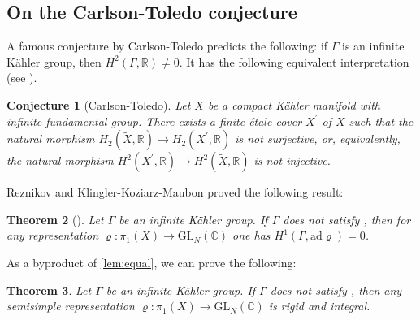 \documentclass[11pt,a4paper,english]{smfart}
\theoremstyle{plain}
\newtheorem{theorem}{Theorem}[section]
\newtheorem{conj}[theorem]{Conjecture}
\theoremstyle{definition}
\theoremstyle{plain}
\newcommand\GL{\mathrm{GL}}
\def\bR{\mathbb{R}}
\def\bC{\mathbb{C}}
\begin{document}
	\iffalse
	\subsection{On the Carlson-Toledo conjecture}
	A famous conjecture by Carlson-Toledo predicts the following: if $\Gamma$ is an infinite Kähler group, then 
	$H^2(\Gamma,\bR)\neq 0$. It has the following equivalent interpretation (see \cite{KKM11}). 
	\begin{conj}[Carlson-Toledo]\label{conj:CT}
		Let $X$ be a compact Kähler manifold with infinite fundamental group. There exists a finite étale cover $X^{\prime}$ of $X$ such that the natural morphism $H_2(\widetilde{X}, \mathbb{R}) \longrightarrow H_2\left(X^{\prime}, \mathbb{R}\right)$ is not surjective, or, equivalently, the natural morphism $H^2\left(X^{\prime}, \mathbb{R}\right) \longrightarrow H^2(\widetilde{X}, \mathbb{R})$ is not injective.
	\end{conj} 
	Reznikov and Klingler-Koziarz-Maubon proved the following result: 
	\begin{theorem}[]\label{KKM}
		Let $\Gamma$ be an infinite Kähler group.  If $\Gamma$ does not satisfy , then for any representation $\varrho:\pi_1(X)\to \GL_N(\bC)$ one has $H^1(\Gamma,\mathrm{ad}\varrho)=0$.  
	\end{theorem} 
	As a byproduct of  \cref{lem:equal}, we can  prove the following:
	\begin{theorem}
		Let $\Gamma$ be an infinite K\"ahler group. 
		If $\Gamma$ does not satisfy , then any semisimple representation $\varrho:\pi_1(X)\to \GL_N(\bC)$ is rigid and integral.
	\end{theorem}
\end{document}

